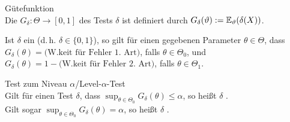 \linie
\pagebreak

\begin{Def}{Gütefunktion}\\
    Die  $G_\delta\colon \Theta \rightarrow [0, 1]$ des Tests $\delta$
    ist definiert durch $G_\delta(\vartheta) := \mathbb{E}_\vartheta(\delta(X))$.
\end{Def}

\begin{Bem}
    Ist $\delta$ ein  (d.\,h. $\delta \in \{0, 1\}$),
    so gilt für einen gegebenen Parameter $\theta \in \Theta$,
    dass $G_\delta(\theta) = \text{(W.keit für Fehler 1. Art)}$, falls $\theta \in \Theta_0$, und\\
    $G_\delta(\theta) = 1 - \text{(W.keit für Fehler 2. Art)}$, falls $\theta \in \Theta_1$.
\end{Bem}

\begin{Def}{Test zum Niveau $\alpha$/Level-$\alpha$-Test}\\
    Gilt für einen Test $\delta$, dass
    $\sup_{\theta \in \Theta_0} G_\delta(\theta) \le \alpha$,
    so heißt $\delta$ .\\
    Gilt sogar $\sup_{\theta \in \Theta_0} G_\delta(\theta) = \alpha$,
    so heißt $\delta$ .
\end{Def}

\linie

